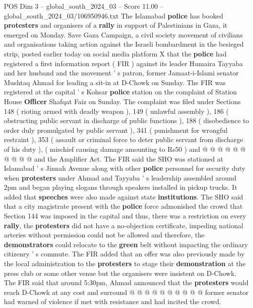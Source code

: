 \begin{textsample}{POS Dim 3 – global\_south\_2024\_03 – Score 11.00 – global\_south\_2024\_03/106950946.txt}  \label{ex:f3_pos_409}
The Islamabad \textbf{police} has booked \textbf{protesters} and organisers of a \textbf{rally} in support of Palestinians in Gaza, it emerged on Monday.
Save Gaza Campaign, a civil society movement of civilians and organisations taking action against the Israeli bombardment in the besieged strip, posted earlier today on social media platform X that the \textbf{police} had registered a first information report ( FIR ) against its leader Humaira Tayyaba and her husband and the movement ' s patron, former Jamaat-i-Islami senator Mushtaq Ahmad for leading a sit-in at D-Chowk on Sunday.
The FIR was registered at the capital ' s Kohsar \textbf{police} station on the complaint of Station House \textbf{Officer} Shafqat Faiz on Sunday.
The complaint was filed under Sections 148 ( rioting armed with deadly weapon ), 149 ( unlawful assembly ), 186 ( obstructing public servant in discharge of public functions ), 188 ( disobedience to order duly promulgated by public servant ), 341 ( punishment for wrongful restraint ), 353 ( assault or criminal force to deter public servant from discharge of his duty ), ( mischief causing damage amounting to Rs50 ) and @ @ @ @ @ @ @ @ @ @ and the Amplifier Act.
The FIR said the SHO was stationed at Islamabad ' s Jinnah Avenue along with other \textbf{police} personnel for security duty when \textbf{protesters} under Ahmad and Tayyaba ' s leadership assembled around 2pm and began playing slogans through speakers installed in pickup trucks.
It added that \textbf{speeches} were also made against state \textbf{institutions}.
The SHO said that a city magistrate present with the \textbf{police} force admonished the crowd that Section 144 was imposed in the capital and thus, there was a restriction on every \textbf{rally}, the \textbf{protesters} did not have a no-objection certificate, impeding national arteries without permission could not be allowed and therefore, the \textbf{demonstrators} could relocate to the \textbf{green} belt without impacting the ordinary citizenry ' s commute.
The FIR added that an offer was also previously made by the local administration to the \textbf{protesters} to stage their \textbf{demonstration} at the press club or some other venue but the organisers were insistent on D-Chowk.
The FIR said that around 5:30pm, Ahmad announced that the \textbf{protesters} would reach D-Chowk at any cost and surround @ @ @ @ @ @ @ @ @ @ former senator had warned of violence if met with resistance and had incited the crowd.

\end{textsample}
